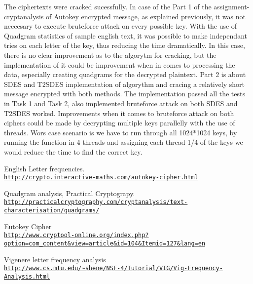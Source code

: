 \documentclass[12pt]{report}
\begin{document}
The ciphertexts were cracked sucessfully. In case of the Part 1 of the assignment- cryptanalysis of Autokey encrypted message, as explained previously, it was not neccesary to execute bruteforce attack on every possible key. With the use of Quadgram statistics of sample english text, it was possible to make independant tries on each letter of the key, thus reducing the time dramatically. In this case, there is no clear improvement as to the algorytm for cracking, but the implementation of it could be improvement when in comes to processing the data, especially creating quadgrams for the decrypted plaintext. Part 2 is about SDES and T2SDES implementation of algorythm and cracing a relatively short message encrypted with both methods. The implementation passed all the tests in Task 1 and Task 2, also implemented bruteforce attack on both SDES and T2SDES worked. Improvements when it comes to bruteforce attack on both ciphers could be made by decrypting multiple keys parallelly with the use of threads. Wors case scenario is we have to run through all 1024*1024 keys, by running the function in 4 threads and assigning each thread 1/4 of the keys we would reduce the time to find the correct key.

\begin{thebibliography}{9}

  English Letter frequencies.
  \\\texttt{\url{http://crypto.interactive-maths.com/autokey-cipher.html}}

  Quadgram analysis, Practical Cryptograpy.
  \\\texttt{\url{http://practicalcryptography.com/cryptanalysis/text-characterisation/quadgrams/}}

  Eutokey Cipher
  \\\texttt{\url{http://www.cryptool-online.org/index.php?option=com_content&view=article&id=104&Itemid=127&lang=en}}

  Vigenere letter frequency analysis
  \\\texttt{\url{http://www.cs.mtu.edu/~shene/NSF-4/Tutorial/VIG/Vig-Frequency-Analysis.html}}

  
\end{thebibliography}
\end{document}
